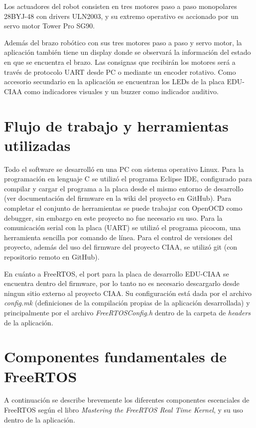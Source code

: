 \documentclass{IEEEtran}
\begin{document}
Los actuadores del robot consisten en tres motores paso a paso monopolares 28BYJ-48 con drivers ULN2003, y su extremo operativo es accionado por un servo motor Tower Pro SG90.

Además del brazo robótico con sus tres motores paso a paso y servo motor, la aplicación también tiene un display donde se observará la información del estado en que se encuentra el brazo. Las consignas que recibirán los motores será a través de protocolo UART desde PC o mediante un encoder rotativo. Como accesorio secundario en la aplicación se encuentran los LEDs de la placa EDU-CIAA como indicadores visuales y un buzzer como indicador auditivo.

\section{Flujo de trabajo y herramientas utilizadas}
Todo el software se desarrolló en una PC con sistema operativo Linux. Para la programación en lenguaje C se utilizó el programa Eclipse IDE, configurado para compilar y cargar el programa a la placa desde el mismo entorno de desarrollo (ver documentación del firmware en la wiki del proyecto\cite{ciaa-wiki} en GitHub). Para completar el conjunto de herramientas se puede trabajar con OpenOCD como debugger, sin embargo en este proyecto no fue necesario su uso. Para la comunicación serial con la placa (UART) se utilizó el programa picocom, una herramienta sencilla por comando de línea. Para el control de versiones del proyecto, además del uso del firmware del proyecto CIAA, se utilizó git (con repositorio remoto en GitHub).

En cuánto a FreeRTOS, el port para la placa de desarrollo EDU-CIAA se encuentra dentro del firmware, por lo tanto no es necesario descargarlo desde ningun sitio externo al proyecto CIAA. Su configuración está dada por el archivo \textit{config.mk} (definiciones de la compilación propias de la aplicación desarrollada) y principalmente por el archivo \textit{FreeRTOSConfig.h} dentro de la carpeta de \textit{headers} de la aplicación.

\section{Componentes fundamentales de FreeRTOS}
A continuación se describe brevemente los diferentes componentes escenciales de FreeRTOS según el libro \textit{Mastering the FreeRTOS Real Time Kernel}, y su uso dentro de la aplicación.
\end{document}
